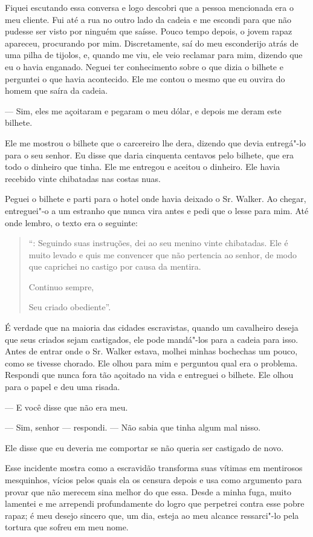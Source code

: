 Fiquei escutando essa conversa e logo descobri que a pessoa mencionada
era o meu cliente. Fui até a rua no outro lado da cadeia e me escondi
para que não pudesse ser visto por ninguém que saísse. Pouco tempo
depois, o jovem rapaz apareceu, procurando por mim. Discretamente, saí
do meu esconderijo atrás de uma pilha de tijolos, e, quando me viu, ele
veio reclamar para mim, dizendo que eu o havia enganado. Neguei ter
conhecimento sobre o que dizia o bilhete e perguntei o que havia
acontecido. Ele me contou o mesmo que eu ouvira do homem que saíra da
cadeia.

--- Sim, eles me açoitaram e pegaram o meu dólar, e depois me deram este
bilhete.

Ele me mostrou o bilhete que o carcereiro lhe dera, dizendo que devia
entregá"-lo para o seu senhor. Eu disse que daria cinquenta centavos pelo
bilhete, que era todo o dinheiro que tinha. Ele me entregou e aceitou o
dinheiro. Ele havia recebido vinte chibatadas nas costas nuas. \label{ref2}

Peguei o bilhete e parti para o hotel onde havia deixado o Sr. Walker.
Ao chegar, entreguei"-o a um estranho que nunca vira antes e pedi que o
lesse para mim. Até onde lembro, o texto era o seguinte:

\begin{quote}
``: Seguindo suas instruções, dei ao seu menino vinte
chibatadas. Ele é muito levado e quis me convencer que não pertencia ao
senhor, de modo que caprichei no castigo por causa da mentira.

Continuo sempre,

Seu criado obediente''.
\end{quote}

É verdade que na maioria das cidades escravistas, quando um cavalheiro
deseja que seus criados sejam castigados, ele pode mandá"-los para a
cadeia para isso. Antes de entrar onde o Sr. Walker estava, molhei
minhas bochechas um pouco, como se tivesse chorado. Ele olhou para mim e
perguntou qual era o problema. Respondi que nunca fora tão açoitado na
vida e entreguei o bilhete. Ele olhou para o papel e deu uma risada.

--- E você disse que não era meu.

--- Sim, senhor --- respondi. --- Não sabia que tinha algum mal nisso.

Ele disse que eu deveria me comportar se não queria ser castigado de
novo.

Esse incidente mostra como a escravidão transforma suas vítimas em
mentirosos mesquinhos, vícios pelos quais ela os censura depois e usa
como argumento para provar que não merecem sina melhor do que essa.
Desde a minha fuga, muito lamentei e me arrependi profundamente do logro \label{ref4}
que perpetrei contra esse pobre rapaz; é meu desejo sincero que, um dia,
esteja ao meu alcance ressarci"-lo pela tortura que sofreu em meu nome.

